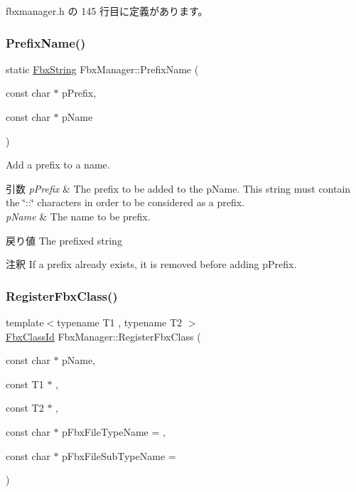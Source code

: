  fbxmanager.\+h の 145 行目に定義があります。

\mbox{\label{class_fbx_manager_ad4998934540803131a74f21041979826}} 
\subsubsection{\texorpdfstring{Prefix\+Name()}{PrefixName()}}
{\footnotesize\ttfamily static \hyperlink{class_fbx_string}{Fbx\+String} Fbx\+Manager\+::\+Prefix\+Name (\begin{DoxyParamCaption}\item[{const char $\ast$}]{p\+Prefix,  }\item[{const char $\ast$}]{p\+Name }\end{DoxyParamCaption})\hspace{0.3cm}{\ttfamily [static]}}

Add a prefix to a name. 
\begin{DoxyParams}{引数}
{\em p\+Prefix} & The prefix to be added to the {\ttfamily p\+Name}. This string must contain the \char`\"{}\+::\char`\"{} characters in order to be considered as a prefix. \\
\hline
{\em p\+Name} & The name to be prefix. \\
\hline
\end{DoxyParams}
\begin{DoxyReturn}{戻り値}
The prefixed string 
\end{DoxyReturn}
\begin{DoxyRemark}{注釈}
If a prefix already exists, it is removed before adding {\ttfamily p\+Prefix}. 
\end{DoxyRemark}
\mbox{\label{class_fbx_manager_aa1caacb212a16e40652f98331fd94500}} 
\subsubsection{\texorpdfstring{Register\+Fbx\+Class()}{RegisterFbxClass()}}
{\footnotesize\ttfamily template$<$typename T1 , typename T2 $>$ \\
\hyperlink{class_fbx_class_id}{Fbx\+Class\+Id} Fbx\+Manager\+::\+Register\+Fbx\+Class (\begin{DoxyParamCaption}\item[{const char $\ast$}]{p\+Name,  }\item[{const T1 $\ast$}]{,  }\item[{const T2 $\ast$}]{,  }\item[{const char $\ast$}]{p\+Fbx\+File\+Type\+Name = {},  }\item[{const char $\ast$}]{p\+Fbx\+File\+Sub\+Type\+Name = {} }\end{DoxyParamCaption})\hspace{0.3cm}{\ttfamily [inline]}}

